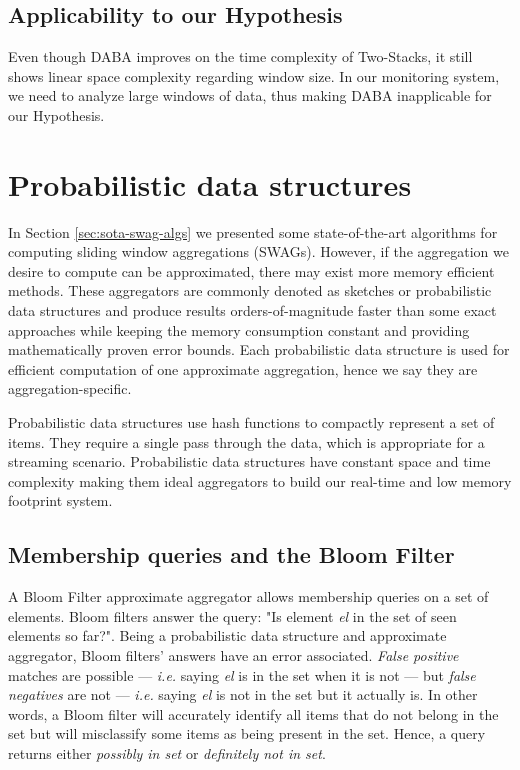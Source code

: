 \subsection*{Applicability to our Hypothesis}
Even though DABA improves on the time complexity of Two-Stacks, it still shows linear space complexity regarding window size. In our monitoring system, we need to analyze large windows of data, thus making DABA inapplicable for our Hypothesis.


\section{Probabilistic data structures} \label{sec:pds}
In Section \ref{sec:sota-swag-algs} we presented some state-of-the-art algorithms for computing sliding window aggregations (SWAGs). However, if the aggregation we desire to compute can be approximated, there may exist more memory efficient methods. These aggregators are commonly denoted as sketches or probabilistic data structures and produce results orders-of-magnitude faster than some exact approaches while keeping the memory consumption constant and providing mathematically proven error bounds. Each probabilistic data structure is used for efficient computation of one approximate aggregation, hence we say they are aggregation-specific.

Probabilistic data structures use hash functions to compactly represent a set of items. They require a single pass through the data, which is appropriate for a streaming scenario. Probabilistic data structures have constant space and time complexity \cite{Singh-PDS-BIGD} making them ideal aggregators to build our real-time and low memory footprint system. 

\subsection{Membership queries and the Bloom Filter} \label{sec:bloom}
A Bloom Filter \cite{BLOOM-BLOOMFILTER} approximate aggregator allows membership queries on a set of elements. Bloom filters answer the query: "Is element \textit{el} in the set of seen elements so far?". Being a probabilistic data structure and approximate aggregator, Bloom filters' answers have an error associated. \textit{False positive} matches are possible --- \textit{i.e.} saying \textit{el} is in the set when it is not --- but \textit{false negatives} are not --- \textit{i.e.} saying \textit{el} is not in the set but it actually is. In other words, a Bloom filter will accurately identify all items that do not belong in the set but will misclassify some items as being present in the set. Hence, a query returns either \textit{possibly in set} or \textit{definitely not in set}.

